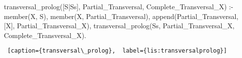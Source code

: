 \begin{center}
\begin{minipage}{\linewidth}
\begin{python}[numbers=left]
transversal_prolog([S|Ss], Partial_Transversal, Complete_Transversal_X) :-
    member(X, S),
    \+ member(X, Partial_Transversal),
    append(Partial_Transversal, [X], Partial_Transversal_X),
    transversal_prolog(Ss, Partial_Transversal_X, Complete_Transversal_X).

\end{python}
\begin{lstlisting} [caption={transversal\_prolog},  label={lis:transversalprolog}]
\end{lstlisting}
\end{minipage}

\end{center}



